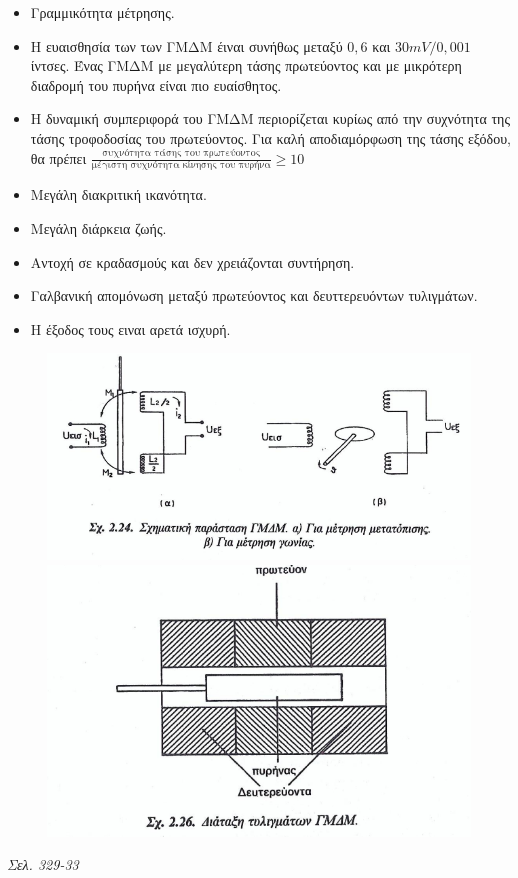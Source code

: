 \documentclass{article}
\begin{document}
\begin{itemize}
    \item Γραμμικότητα μέτρησης.
    \item Η ευαισθησία των των ΓΜΔΜ έιναι συνήθως μεταξύ $0,6$ και $30mV/0,001$ ίντσες. Ένας ΓΜΔΜ με μεγαλύτερη τάσης πρωτεύοντος και με μικρότερη διαδρομή του πυρήνα είναι πιο ευαίσθητος.
    \item Η δυναμική συμπεριφορά του ΓΜΔΜ περιορίζεται κυρίως από την συχνότητα της τάσης τροφοδοσίας του πρωτεύοντος. Για καλή αποδιαμόρφωση της τάσης εξόδου, θα πρέπει
        \newline$\frac{\text{συχνότητα τάσης του πρωτεύοντος}}{\text{μέγιστη συχνότητα κίνησης του πυρήνα}}\geq 10$
    \item Μεγάλη διακριτική ικανότητα.
    \item Μεγάλη διάρκεια ζωής.
    \item Αντοχή σε κραδασμούς και δεν χρειάζονται συντήρηση.
    \item Γαλβανική απομόνωση μεταξύ πρωτεύοντος και δευττερευόντων τυλιγμάτων.
    \item Η έξοδος τους ειναι αρετά ισχυρή.
\end{itemize}

\begin{figure}[h!]
    \includegraphics[width=\linewidth]{GMDM1.png}
    \includegraphics[width=\linewidth]{GMDM2.png}
\end{figure}
\emph{Σελ. 329-33}
\end{document}
